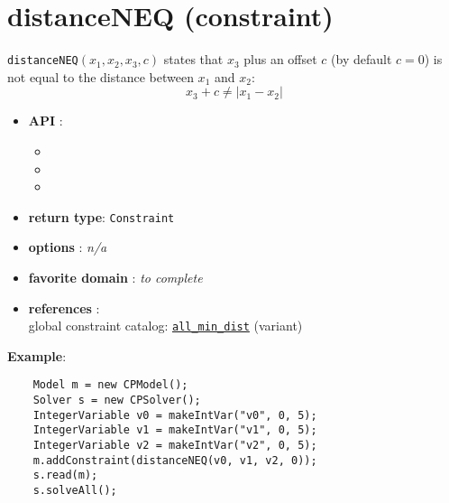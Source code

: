 \label{distanceneq}
\hypertarget{distanceneq}{}

\section{distanceNEQ (constraint)}\label{distanceneq:distanceneqconstraint}\hypertarget{distanceneq:distanceneqconstraint}{}
\begin{notedef}
  \texttt{distanceNEQ}$(x_1,x_2,x_3,c)$ states that $x_3$ plus an offset $c$ (by default $c=0$) is not equal to the distance between $x_1$ and $x_2$:
$$ x_3 + c \neq | x_1 - x_2 |$$
\end{notedef}

\begin{itemize}
	\item \textbf{API} :
	\begin{itemize}
		\item {}
		\item {}
		\item {}
	\end{itemize}
	\item \textbf{return type}: \texttt{Constraint}
	\item \textbf{options} : \emph{n/a}
	\item \textbf{favorite domain} : \emph{to complete}
	\item \textbf{references} :\\
      global constraint catalog: \href{http://www.emn.fr/x-info/sdemasse/gccat/Call_min_dist.html}{\tt all\_min\_dist} (variant)
\end{itemize}

\textbf{Example}:
\begin{lstlisting}
	Model m = new CPModel();
	Solver s = new CPSolver();
	IntegerVariable v0 = makeIntVar("v0", 0, 5);
	IntegerVariable v1 = makeIntVar("v1", 0, 5);
	IntegerVariable v2 = makeIntVar("v2", 0, 5);
	m.addConstraint(distanceNEQ(v0, v1, v2, 0));
	s.read(m);
	s.solveAll();
\end{lstlisting}
